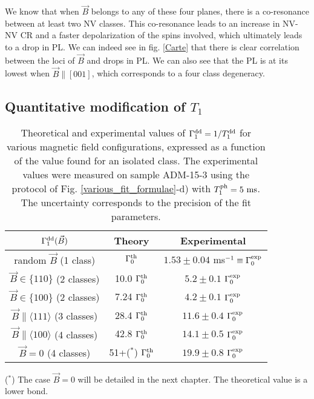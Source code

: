 \documentclass[a4paper, 11pt]{report}
\begin{document}
We know that when $\vec{B}$ belongs to any of these four planes, there is a co-resonance between at least two NV classes. This co-resonance leads to an increase in NV-NV CR and a faster depolarization of the spins involved, which ultimately leads to a drop in PL. We can indeed see in fig. \ref{Carte} that there is clear correlation between the loci of $\vec{B}$ and drops in PL. We can also see that the PL is at its lowest when $\vec{B}\parallel [001]$, which corresponds to a four class degeneracy.

\subsection{Quantitative modification of $T_1$}
\label{sec quantitative T1}
\begin{table}[htbp]
\centering
\caption{Theoretical and experimental values of $\Gamma_1^{\rm dd}=1/T_1^{\rm dd}$ for various magnetic field configurations, expressed as a function of the value found for an isolated class. The experimental values were measured on sample ADM-15-3 using the protocol of Fig. \ref{various_fit_formulae}-d) with $T_1^{\rm ph}= 5\ \rm ms$. The uncertainty corresponds to the precision of the fit parameters.}
 \label{T1 champ mag}
\begin{tabular}{c|cc}
\toprule
$\Gamma_1^{\rm dd} (\vec{B})$ & Theory & Experimental \\
\midrule
random $\vec{B}$ (1 class) & $\Gamma_0^{\rm th}$ & $1.53\pm 0.04$ ms$^{-1} \equiv \Gamma_0^{\rm exp}$ \\
$\vec{B} \in \{110\}$ (2 classes) & 10.0 $\Gamma_0^{\rm th}$ & $5.2 \pm 0.1$ $\Gamma_0^{\rm exp}$ \\
$\vec{B} \in \{100\}$ (2 classes) & 7.24 $\Gamma_0^{\rm th}$ & $4.2 \pm 0.1$ $\Gamma_0^{\rm exp}$ \\
$\vec{B} \parallel \langle 111 \rangle$ (3 classes) & 28.4 $\Gamma_0^{\rm th}$ & $11.6 \pm 0.4$ $\Gamma_0^{\rm exp}$ \\
$\vec{B} \parallel \langle 100 \rangle$ (4 classes) & 42.8 $\Gamma_0^{\rm th}$ & $14.1 \pm 0.5$ $\Gamma_0^{\rm exp}$ \\
$\vec{B}=0$ (4 classes) & 51+($^*$) $\Gamma_0^{\rm th}$ & $19.9 \pm 0.8$ $\Gamma_0^{\rm exp}$ \\
\bottomrule
\end{tabular}

($^*$) The case $\vec{B}=0$ will be detailed in the next chapter. The theoretical value is a lower bond.
\end{table}
\end{document}
